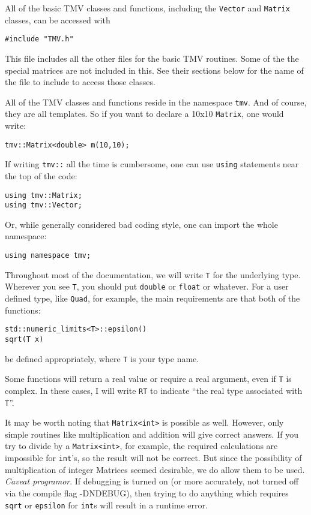 \documentclass[twoside,letterpaper,11pt]{article}
\renewcommand{\tt}[1]{{\texttt {#1}}}
\begin{document}
All of the basic TMV classes and functions, including the \tt{Vector} and \tt{Matrix} 
classes, can be accessed with
\begin{verbatim}
#include "TMV.h"
\end{verbatim}
This file includes all the other files for the basic TMV routines.  Some of the the 
special matrices are not included in this.  See their sections below for the name 
of the file to include to access those classes.

All of the TMV classes and functions reside in the namespace \tt{tmv}. 
And of course, they are all templates.
So if you want to declare a 10x10 \tt{Matrix}, one would write:
\begin{verbatim}
tmv::Matrix<double> m(10,10);
\end{verbatim}

If writing \tt{tmv::} all the time is cumbersome, one can use \tt{using}
statements near the top of the code:
\begin{verbatim}
using tmv::Matrix;
using tmv::Vector;
\end{verbatim}
Or, while generally considered bad coding style, one can import the whole namespace:
\begin{verbatim}
using namespace tmv;
\end{verbatim}

Throughout most of the documentation, we will write \tt{T} for the underlying type.
Wherever you see \tt{T}, you should put \tt{double} or \tt{float} or whatever.
For a user defined type, like \tt{Quad}, for example, the main requirements are that 
both of the functions:
\begin{verbatim}
std::numeric_limits<T>::epsilon()
sqrt(T x) 
\end{verbatim}
be defined appropriately, where \tt{T} is your type name.  

Some functions will return a real value or require a real argument, even if \tt{T}
is complex.  In these cases, I will write \tt{RT} to indicate 
``the real type associated with \tt{T}''.

It may be worth noting that \tt{Matrix<int>} is possible as well.  
However, only simple 
routines like multiplication and addition will give correct answers.  If you try to 
divide by a \tt{Matrix<int>}, for example, the required calculations are impossible 
for \tt{int}'s,
so the result will not be correct.  But since the possibility of multiplication of 
integer Matrices seemed desirable, we do allow them to be used.  
\emph{Caveat programor}.  If debugging is turned on (or more accurately, not
turned off via the compile flag -DNDEBUG), then trying to do anything which requires
\tt{sqrt} or \tt{epsilon} for \tt{int}s will result in a runtime error.
\end{document}
